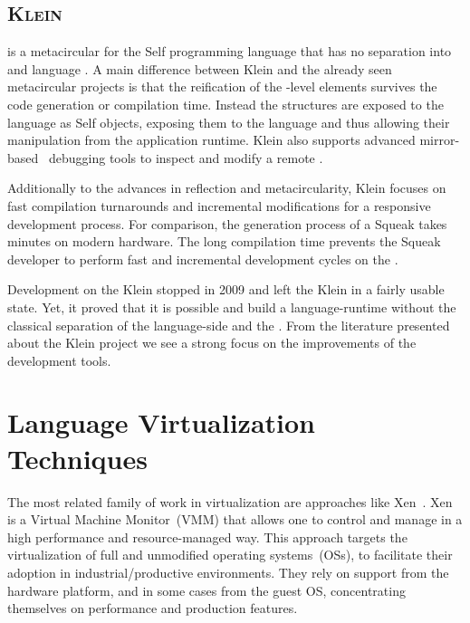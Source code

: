 \subsection*{\textsc{Klein \VM}}

 is a metacircular \VM for the Self programming language that has no separation into \VM and language \cite{Unga05a}.
A main difference between Klein and the already seen metacircular \VM projects is that the reification of the \VM-level elements survives the code generation or compilation time.
Instead the \VM structures are exposed to the language as Self objects, exposing them to the language and thus allowing their manipulation from the application runtime.
Klein also supports advanced mirror-based~\cite{Brac04b} debugging tools to inspect and modify a remote \VM.

Additionally to the advances in reflection and metacircularity, Klein focuses on fast compilation turnarounds and incremental modifications for a responsive development process.
For comparison, the generation process of a Squeak \VM takes minutes on modern hardware. The long compilation time prevents the Squeak \VM developer to perform fast and incremental development cycles on the \VM.

Development on the Klein \VM stopped in 2009 and left the Klein \VM in a fairly usable state.
Yet, it proved that it is possible and build a language-runtime without the classical separation of the language-side and the \VM.
From the literature presented about the Klein project we see a strong focus on the improvements of the development tools.

\section{Language Virtualization Techniques}\label{sec:background_virtualization_techniques}

The most related family of work in virtualization are approaches like Xen~\cite{Chis07a}. Xen is a Virtual Machine Monitor~(VMM) that allows one to control and manage \VMs in a high performance and resource-managed way. This approach targets the virtualization of full and unmodified operating systems~(OSs), to facilitate their adoption in industrial/productive environments. They rely on support from the hardware platform, and in some cases from the guest OS, concentrating themselves on performance and production features.

